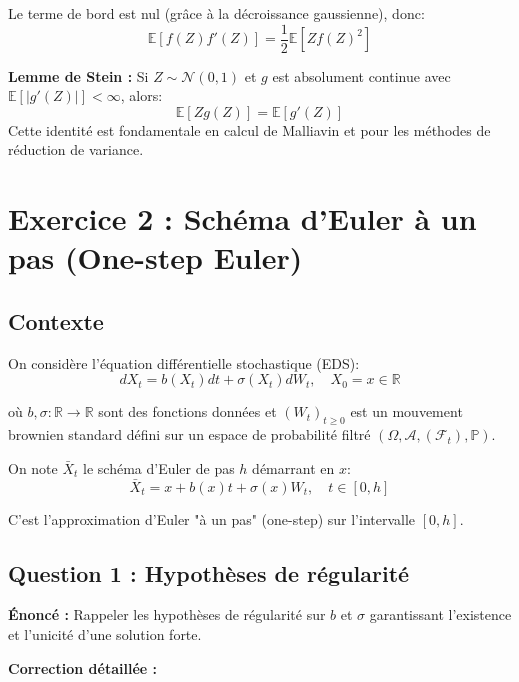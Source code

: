 \documentclass[12pt,a4paper]{article}
\theoremstyle{definition}
\newcommand{\E}{\mathbb{E}}
\newcommand{\R}{\mathbb{R}}
\newcommand{\prob}{\mathbb{P}}
\begin{document}
Le terme de bord est nul (grâce à la décroissance gaussienne), donc:
\[
\E[f(Z)f'(Z)] = \frac{1}{2}\E[Zf(Z)^2]
\]

\begin{rappel}
\textbf{Lemme de Stein :} Si $Z \sim \mathcal{N}(0,1)$ et $g$ est absolument continue avec $\E[|g'(Z)|] < \infty$, alors:
\[
\E[Zg(Z)] = \E[g'(Z)]
\]
Cette identité est fondamentale en calcul de Malliavin et pour les méthodes de réduction de variance.
\end{rappel}

\section{Exercice 2 : Schéma d'Euler à un pas (One-step Euler)}

\subsection{Contexte}

On considère l'équation différentielle stochastique (EDS):
\[
dX_t = b(X_t)dt + \sigma(X_t)dW_t, \quad X_0 = x \in \R
\]

où $b, \sigma : \R \to \R$ sont des fonctions données et $(W_t)_{t \geq 0}$ est un mouvement brownien standard défini sur un espace de probabilité filtré $(\Omega, \mathcal{A}, (\mathcal{F}_t), \prob)$.

On note $\bar{X}_t$ le schéma d'Euler de pas $h$ démarrant en $x$:
\[
\bar{X}_t = x + b(x)t + \sigma(x)W_t, \quad t \in [0, h]
\]

C'est l'approximation d'Euler "à un pas" (one-step) sur l'intervalle $[0, h]$.

\subsection{Question 1 : Hypothèses de régularité}

\textbf{Énoncé :} Rappeler les hypothèses de régularité sur $b$ et $\sigma$ garantissant l'existence et l'unicité d'une solution forte.

\textbf{Correction détaillée :}
\end{document}
